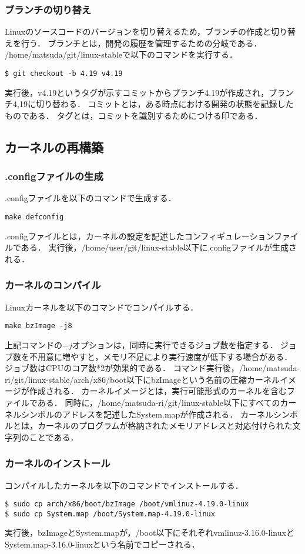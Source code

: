 \documentclass[12pt]{jsarticle}
\begin{document}
\subsubsection{ブランチの切り替え}
Linuxのソースコードのバージョンを切り替えるため，ブランチの作成と切り替えを行う．
ブランチとは，開発の履歴を管理するための分岐である．
/home/matsuda/git/linux-stableで以下のコマンドを実行する．
\begin{verbatim}
$ git checkout -b 4.19 v4.19
\end{verbatim}
実行後，v4.19というタグが示すコミットからブランチ4.19が作成され，ブランチ4,19に切り替わる．
コミットとは，ある時点における開発の状態を記録したものである．
タグとは，コミットを識別するためにつける印である．

\subsection{カーネルの再構築}
\subsubsection{.configファイルの生成}
.configファイルを以下のコマンドで生成する．
\begin{verbatim}
make defconfig
\end{verbatim}
.configファイルとは，カーネルの設定を記述したコンフィギュレーションファイルである．
実行後，/home/user/git/linux-stable以下に.configファイルが生成される．

\subsubsection{カーネルのコンパイル}
Linuxカーネルを以下のコマンドでコンパイルする．
\begin{verbatim}
make bzImage -j8
\end{verbatim}
上記コマンドの$-j$オプションは，同時に実行できるジョブ数を指定する．
ジョブ数を不用意に増やすと，メモリ不足により実行速度が低下する場合がある．
ジョブ数はCPUのコア数*2が効果的である．
コマンド実行後，/home/matsuda-ri/git/linux-stable/arch/x86/boot以下にbzImageという名前の圧縮カーネルイメージが作成される．
カーネルイメージとは，実行可能形式のカーネルを含むファイルである．
同時に，/home/matsuda-ri/git/linux-stable以下にすべてのカーネルシンボルのアドレスを記述したSystem.mapが作成される．
カーネルシンボルとは，カーネルのプログラムが格納されたメモリアドレスと対応付けられた文字列のことである．

\subsubsection{カーネルのインストール}
コンパイルしたカーネルを以下のコマンドでインストールする．
\begin{verbatim}
$ sudo cp arch/x86/boot/bzImage /boot/vmlinuz-4.19.0-linux
$ sudo cp System.map /boot/System.map-4.19.0-linux
\end{verbatim}
実行後，bzImageとSystem.mapが，/boot以下にそれぞれvmlinuz-3.16.0-linuxとSystem.map-3.16.0-linuxという名前でコピーされる．
\end{document}
